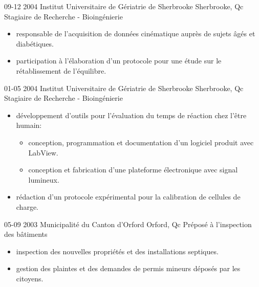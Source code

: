 \documentclass[]{friggeri-cv} %
\begin{document}
\begin{entrylist}
  \entryBul
    {09-12 2004}
    {Institut Universitaire de Gériatrie de Sherbrooke}
    {Sherbrooke, Qc}
    {Stagiaire de Recherche - Bioingénierie}
    {
     \begin{itemize}[leftmargin=*]
       \setlength\itemsep{0pt}
       \item responsable de l'acquisition de données cinématique auprès de sujets âgés et diabétiques.
       \item participation à l'élaboration d'un protocole pour une étude sur le rétablissement de l'équilibre.
     \end{itemize}
     }
\end{entrylist}
\begin{entrylist}
  \entryBul
    {01-05 2004}
    {Institut Universitaire de Gériatrie de Sherbrooke}
    {Sherbrooke, Qc}
    {Stagiaire de Recherche - Bioingénierie}
    {
     \begin{itemize}[leftmargin=*]
       \setlength\itemsep{0pt}       
       \item développement d'outils pour l'évaluation du temps de réaction chez l'être humain:
         \begin{itemize}
           \item conception, programmation et documentation d'un logiciel produit avec LabView.
           \item conception et fabrication d'une plateforme électronique avec signal lumineux.
         \end{itemize}
       \item rédaction d'un protocole expérimental pour la calibration de cellules de charge.
     \end{itemize}
     }
\end{entrylist}
\begin{entrylist}
  \entryBul
    {05-09 2003}
    {Municipalité du Canton d'Orford}
    {Orford, Qc}
    {Préposé à l'inspection des bâtiments}
    {
     \begin{itemize}[leftmargin=*]
       \setlength\itemsep{0pt}  
       \item inspection des nouvelles propriétés et des installations septiques.
       \item gestion des plaintes et des demandes de permis mineurs déposés par les citoyens.
     \end{itemize}
    }
\end{entrylist}
\end{document}
